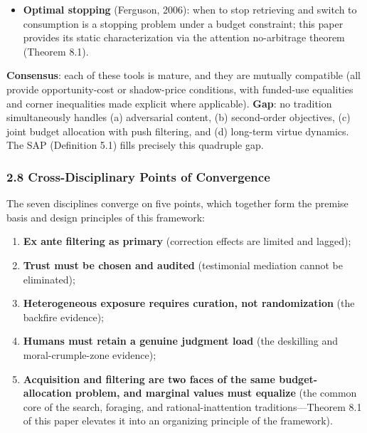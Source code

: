 \documentclass[
  11pt]{article}
\providecommand{\tightlist}{%
  \setlength{\itemsep}{0pt}\setlength{\parskip}{0pt}}
\begin{document}
\begin{itemize}
  experiment to maximize the expected gain in posterior utility---is the
  direct ancestor of this paper's pull-side query planner; the value of
  a query equals the expected information gain (EIG); under
  conditionally independent observations, EIG is monotone and submodular
  in the query set (Krause, Singh \& Guestrin, 2008), and greedy
  selection achieves the \((1-1/e)\) guarantee (Theorem 8.2). Within
  SEA, DeGroot's criterion operates under an attention budget and
  against a declared \(g^{(2)}\), with the Pandora index (Weitzman,
  1979) as its frozen-box special case (§8.6).
\item
  \textbf{Optimal stopping} (Ferguson, 2006): when to stop retrieving
  and switch to consumption is a stopping problem under a budget
  constraint; this paper provides its static characterization via the
  attention no-arbitrage theorem (Theorem 8.1).
\end{itemize}

\textbf{Consensus}: each of these tools is mature, and they are mutually
compatible (all provide opportunity-cost or shadow-price conditions,
with funded-use equalities and corner inequalities made explicit where
applicable). \textbf{Gap}: no tradition simultaneously handles (a)
adversarial content, (b) second-order objectives, (c) joint budget
allocation with push filtering, and (d) long-term virtue dynamics. The
SAP (Definition 5.1) fills precisely this quadruple gap.

\subsubsection{2.8 Cross-Disciplinary Points of
Convergence}\label{cross-disciplinary-points-of-convergence}

The seven disciplines converge on five points, which together form the
premise basis and design principles of this framework:

\begin{enumerate}
\def\labelenumi{\arabic{enumi}.}
\tightlist
\item
  \textbf{Ex ante filtering as primary} (correction effects are limited
  and lagged);
\item
  \textbf{Trust must be chosen and audited} (testimonial mediation
  cannot be eliminated);
\item
  \textbf{Heterogeneous exposure requires curation, not randomization}
  (the backfire evidence);
\item
  \textbf{Humans must retain a genuine judgment load} (the deskilling
  and moral-crumple-zone evidence);
\item
  \textbf{Acquisition and filtering are two faces of the same
  budget-allocation problem, and marginal values must equalize} (the
  common core of the search, foraging, and rational-inattention
  traditions---Theorem 8.1 of this paper elevates it into an organizing
  principle of the framework).
\end{enumerate}
\end{document}
